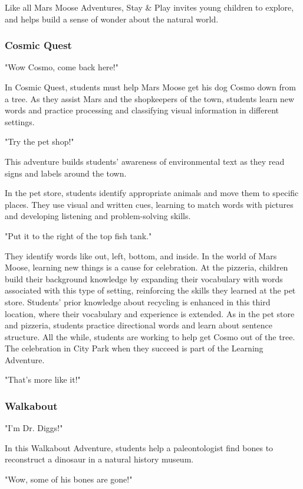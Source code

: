 Like all Mars Moose Adventures, Stay \& Play invites young children to explore, and helps build a sense of wonder about the natural world.

\subsubsection{Cosmic Quest}

"Wow Cosmo, come back here!"

In Cosmic Quest, students must help Mars Moose get his dog Cosmo down from a tree.
As they assist Mars and the shopkeepers of the town, students learn new words and practice processing and classifying visual information in different settings.

"Try the pet shop!"

This adventure builds students' awareness of environmental text as they read signs and labels around the town.

In the pet store, students identify appropriate animals and move them to specific places.
They use visual and written cues, learning to match words with pictures and developing listening and problem-solving skills.

"Put it to the right of the top fish tank."

They identify words like out, left, bottom, and inside.
In the world of Mars Moose, learning new things is a cause for celebration.
At the pizzeria, children build their background knowledge by expanding their vocabulary with words associated with this type of setting, reinforcing the skills they learned at the pet store.
Students' prior knowledge about recycling is enhanced in this third location, where their vocabulary and experience is extended.
As in the pet store and pizzeria, students practice directional words and learn about sentence structure.
All the while, students are working to help get Cosmo out of the tree.
The celebration in City Park when they succeed is part of the Learning Adventure.

"That's more like it!"

\subsubsection{Walkabout}

"I'm Dr. Diggs!"

In this Walkabout Adventure, students help a paleontologist find bones to reconstruct a dinosaur in a natural history museum.

"Wow, some of his bones are gone!"

